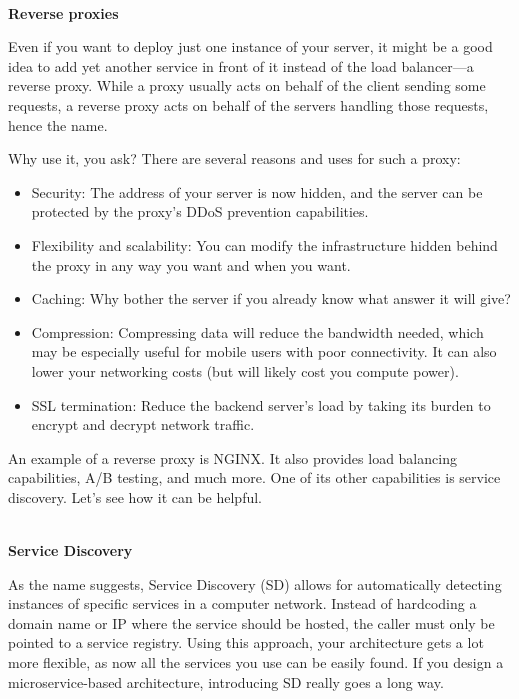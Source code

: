 \hspace*{\fill} \\ %
\noindent
\textbf{Reverse proxies}

Even if you want to deploy just one instance of your server, it might be a good idea to add yet another service in front of it instead of the load balancer—a reverse proxy. While a proxy usually acts on behalf of the client sending some requests, a reverse proxy acts on behalf of the servers handling those requests, hence the name.

Why use it, you ask? There are several reasons and uses for such a proxy:

\begin{itemize}
\item 
Security: The address of your server is now hidden, and the server can be protected by the proxy's DDoS prevention capabilities.

\item 
Flexibility and scalability: You can modify the infrastructure hidden behind the proxy in any way you want and when you want.

\item 
Caching: Why bother the server if you already know what answer it will give?

\item 
Compression: Compressing data will reduce the bandwidth needed, which may be especially useful for mobile users with poor connectivity. It can also lower your networking costs (but will likely cost you compute power).

\item 
SSL termination: Reduce the backend server's load by taking its burden to encrypt and decrypt network traffic.
\end{itemize}

An example of a reverse proxy is NGINX. It also provides load balancing capabilities, A/B testing, and much more. One of its other capabilities is service discovery. Let's see how it can be helpful.

\hspace*{\fill} \\ %
\noindent
\textbf{Service Discovery}

As the name suggests, Service Discovery (SD) allows for automatically detecting instances of specific services in a computer network. Instead of hardcoding a domain name or IP where the service should be hosted, the caller must only be pointed to a service registry. Using this approach, your architecture gets a lot more flexible, as now all the services you use can be easily found. If you design a microservice-based architecture, introducing SD really goes a long way.

